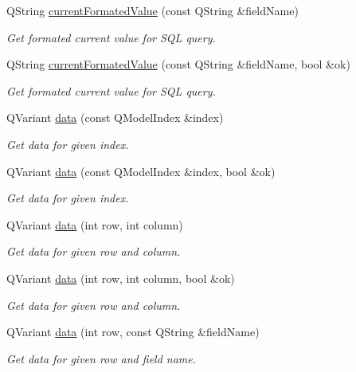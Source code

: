 \begin{DoxyCompactItemize}
Q\-String \hyperlink{classmdt_abstract_sql_table_controller_a0af4c6d87f3d5b1ba7220c58e865dd1f}{current\-Formated\-Value} (const Q\-String \&field\-Name)
\begin{DoxyCompactList}\small\item\em Get formated current value for S\-Q\-L query. \end{DoxyCompactList}\item 
Q\-String \hyperlink{classmdt_abstract_sql_table_controller_a43311c27eab3a892fd079164abf3501f}{current\-Formated\-Value} (const Q\-String \&field\-Name, bool \&ok)
\begin{DoxyCompactList}\small\item\em Get formated current value for S\-Q\-L query. \end{DoxyCompactList}\item 
Q\-Variant \hyperlink{classmdt_abstract_sql_table_controller_a1801a01c0ce073c2e389b20f58a3d3ff}{data} (const Q\-Model\-Index \&index)
\begin{DoxyCompactList}\small\item\em Get data for given index. \end{DoxyCompactList}\item 
Q\-Variant \hyperlink{classmdt_abstract_sql_table_controller_a25fec3a81261364e248332a71b01822e}{data} (const Q\-Model\-Index \&index, bool \&ok)
\begin{DoxyCompactList}\small\item\em Get data for given index. \end{DoxyCompactList}\item 
Q\-Variant \hyperlink{classmdt_abstract_sql_table_controller_af1d1cc870f914ee8278884a118325fba}{data} (int row, int column)
\begin{DoxyCompactList}\small\item\em Get data for given row and column. \end{DoxyCompactList}\item 
Q\-Variant \hyperlink{classmdt_abstract_sql_table_controller_a09ac7fcd64c6d75ebbbd15ab30957674}{data} (int row, int column, bool \&ok)
\begin{DoxyCompactList}\small\item\em Get data for given row and column. \end{DoxyCompactList}\item 
Q\-Variant \hyperlink{classmdt_abstract_sql_table_controller_a83e15b11cdbdd9455049454dca6d4331}{data} (int row, const Q\-String \&field\-Name)
\begin{DoxyCompactList}\small\item\em Get data for given row and field name. \end{DoxyCompactList}\item 

\end{DoxyCompactItemize}
